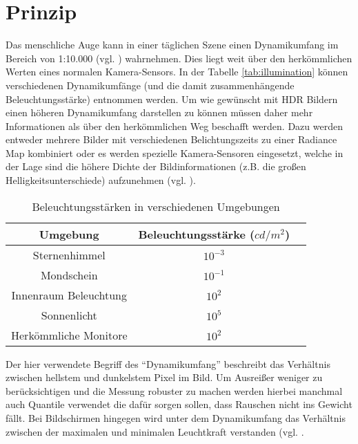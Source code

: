 \section{Prinzip}

Das menschliche Auge kann in einer täglichen Szene einen \gls{Dynamikumfang} im Bereich von 1:10.000 (vgl. \cite{Fairchild04theicam}) wahrnehmen. Dies liegt weit über den herkömmlichen Werten eines normalen Kamera-Sensors. In der Tabelle \autoref{tab:illumination} können verschiedenen Dynamikumfänge (und die damit zusammenhängende Beleuchtungsstärke) entnommen werden. 
Um wie gewünscht mit \gls{HDR} Bildern einen höheren \gls{Dynamikumfang} darstellen zu können müssen daher mehr Informationen als über den herkömmlichen Weg beschafft werden. Dazu werden entweder mehrere Bilder mit verschiedenen \glspl{Belichtungszeit} zu einer \gls{Radiance Map} kombiniert oder es werden spezielle Kamera-Sensoren eingesetzt, welche in der Lage sind die höhere Dichte der Bildinformationen (z.B. die großen Helligkeitsunterschiede) aufzunehmen (vgl. \cite{Yang99a640}). 


\begin{table}
  \begin{center}
    \begin{tabular}{ccc}
	\toprule
	Umgebung & Beleuchtungsstärke ($cd/m^2$)\\ \midrule
	Sternenhimmel & $10^{-3} $\\	
	Mondschein & $10^{-1} $\\	
	Innenraum Beleuchtung & $10^{2} $\\	
	Sonnenlicht & $10^{5} $\\	
	\midrule
	Herkömmliche Monitore & $10^{2} $\\	
	\bottomrule
    \end{tabular}
    \caption{Beleuchtungsstärken in verschiedenen Umgebungen \cite[S.~6]{Reinhard}}
    \label{tab:illumination}
  \end{center}
\end{table}



Der hier verwendete Begriff des \enquote{\gls{Dynamikumfang}} beschreibt das Verhältnis zwischen hellstem und dunkelstem Pixel im Bild. Um Ausreißer weniger zu berücksichtigen und die Messung robuster zu machen werden hierbei manchmal auch Quantile verwendet die dafür sorgen sollen, dass Rauschen nicht ins Gewicht fällt. Bei Bildschirmen hingegen wird unter dem \gls{Dynamikumfang} das Verhältnis zwischen der maximalen und minimalen Leuchtkraft verstanden (vgl. \cite[S.~4]{Reinhard}.

